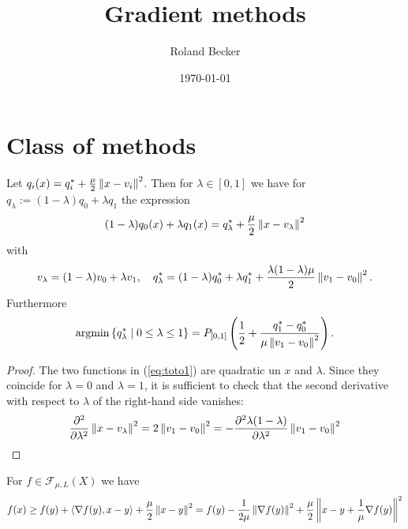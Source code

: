 \documentclass[english,12pt,a4paper]{article}
\title{Gradient methods}
\author{Roland Becker}
\date{\today}
\begin{document}
\maketitle
\setcounter{tocdepth}{2}
\tableofcontents
%
%
\section{Class of methods}\label{sec:}
%
\begin{lemma}\label{lemma:}
Let $q_i(x) = q_i^* + \frac{\mu}{2}\left\|x- v_i\right\|^2$. Then for $\lambda\in[0,1]$ we have for $q_{\lambda} := (1-\lambda)q_0+ \lambda q_1$ the expression
%
\begin{equation}\label{eq:toto1}
%
(1-\lambda)q_0(x) + \lambda q_1(x) = q_{\lambda}^* + \frac{\mu}{2}\norm{x- v_{\lambda}}^2
\end{equation}
%
with
%
\begin{equation}\label{eq:toto2}
v_{\lambda} = (1-\lambda)v_0 + \lambda v_1,\quad q_{\lambda}^* = (1-\lambda)q_0^* + \lambda q_1^* + \frac{\lambda(1-\lambda)\mu}{2}\left\|v_1-v_0\right\|^2.
\end{equation}
%
Furthermore
%
\begin{equation}\label{eq:}
\operatorname*{argmin}\left\{q^*_{\lambda}\;\middle|\;0\le \lambda\le1\right\} = P_{[0,1]}\left(\frac12 + \frac{q_1^*-q_0^*}{\mu\left\|v_1-v_0\right\|^2}\right).
\end{equation}
%
\end{lemma}
%
\begin{proof}
The two functions in (\ref{eq:toto1}) are quadratic un $x$ and $\lambda$. Since they coincide for $\lambda=0$ and $\lambda=1$, it is sufficient to check that the second derivative with respect to $\lambda$ of the right-hand side vanishes:
%
\begin{align*}
\frac{\partial^2}{\partial \lambda^2}\left\|x-v_\lambda\right\|^2 = 2\left\|v_1-v_0\right\|^2 = -\frac{\partial^2\lambda(1-\lambda)}{\partial \lambda^2} \left\|v_1-v_0\right\|^2
\end{align*}
%
\end{proof}
%

For $f\in\mathcal F_{\mu,L}(X)$ we  have
%
\begin{align*}
f(x) \ge f(y) + \langle\nabla f(y),x-y\rangle + \frac{\mu}{2}\left\|x-y\right\|^2 = f(y) - \frac{1}{2\mu}\left\|\nabla f(y)\right\|^2 + \frac{\mu}{2}\left\|x-y+\frac{1}{\mu}\nabla f(y)\right\|^2
\end{align*}
%
\end{document}

